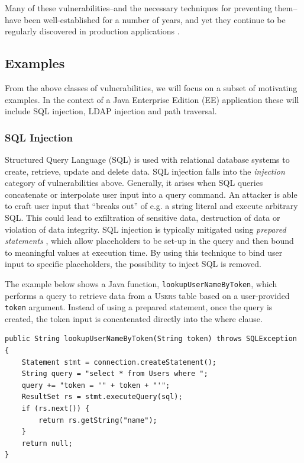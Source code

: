 \documentclass[a4paper,openany,12pt]{book}
\begin{document}
Many of these vulnerabilities--and the necessary techniques for preventing them--have been well-established for a
number of years, and yet they continue to be regularly discovered in production applications \citep[p.~2]{schneier2011secrets}.

\subsection{Examples}

From the above classes of vulnerabilities, we will focus on a subset of motivating examples.
In the context of a Java Enterprise Edition (EE) application these will include SQL injection, LDAP injection and
path traversal.

\subsubsection{SQL Injection}
\label{ex:sqli}

Structured Query Language (SQL) is used with relational database systems to create, retrieve, update and delete data.
SQL injection falls into the \emph{injection} category of vulnerabilities above.
Generally, it arises when SQL queries concatenate or interpolate user input into a query command.
An attacker is able to craft user input that ``breaks out'' of e.g. a string literal and execute arbitrary SQL.
This could lead to exfiltration of sensitive data, destruction of data or violation of data integrity.
SQL injection is typically mitigated using \emph{prepared statements} \citep{stuttard2011web}, which allow placeholders to be set-up in the
query and then bound to meaningful values at execution time.
By using this technique to bind user input to specific placeholders, the possibility to inject SQL is removed.

The example below shows a Java function, \texttt{lookupUserNameByToken}, which performs a query to retrieve data from
a \textsc{Users} table based on a user-provided \texttt{token} argument.
Instead of using a prepared statement, once the query is created, the token input is concatenated directly into the
\textcolor{id7-aubergine}{where} clause.

\newsavebox\myv

\begin{lrbox}{\myv}\begin{minipage}{\textwidth}
\begin{verbatim}
public String lookupUserNameByToken(String token) throws SQLException {
    Statement stmt = connection.createStatement();
    String query = "select * from Users where ";
    query += "token = '" + token + "'";
    ResultSet rs = stmt.executeQuery(sql);
    if (rs.next()) {
        return rs.getString("name");
    }
    return null;
}
\end{verbatim}
\end{minipage}\end{lrbox}
\end{document}

